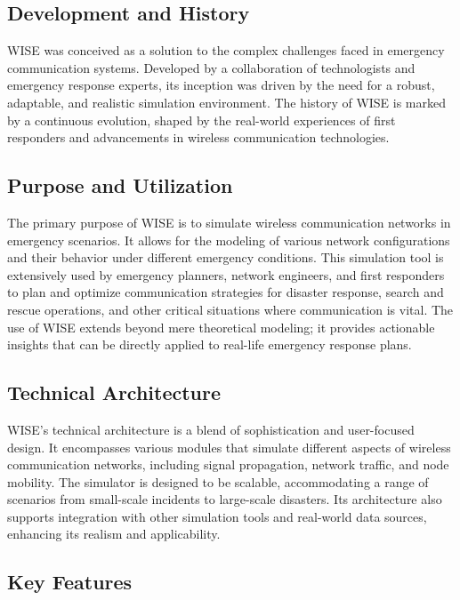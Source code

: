 \documentclass[journal]{IEEEtran}
\begin{document}
\subsection{Development and History}

WISE was conceived as a solution to the complex challenges faced in emergency communication systems. Developed by a collaboration of technologists and emergency response experts, its inception was driven by the need for a robust, adaptable, and realistic simulation environment. The history of WISE is marked by a continuous evolution, shaped by the real-world experiences of first responders and advancements in wireless communication technologies.

\subsection{Purpose and Utilization}

The primary purpose of WISE is to simulate wireless communication networks in emergency scenarios. It allows for the modeling of various network configurations and their behavior under different emergency conditions. This simulation tool is extensively used by emergency planners, network engineers, and first responders to plan and optimize communication strategies for disaster response, search and rescue operations, and other critical situations where communication is vital. The use of WISE extends beyond mere theoretical modeling; it provides actionable insights that can be directly applied to real-life emergency response plans.

\subsection{Technical Architecture}

WISE's technical architecture is a blend of sophistication and user-focused design. It encompasses various modules that simulate different aspects of wireless communication networks, including signal propagation, network traffic, and node mobility. The simulator is designed to be scalable, accommodating a range of scenarios from small-scale incidents to large-scale disasters. Its architecture also supports integration with other simulation tools and real-world data sources, enhancing its realism and applicability.

\subsection{Key Features}
\end{document}
